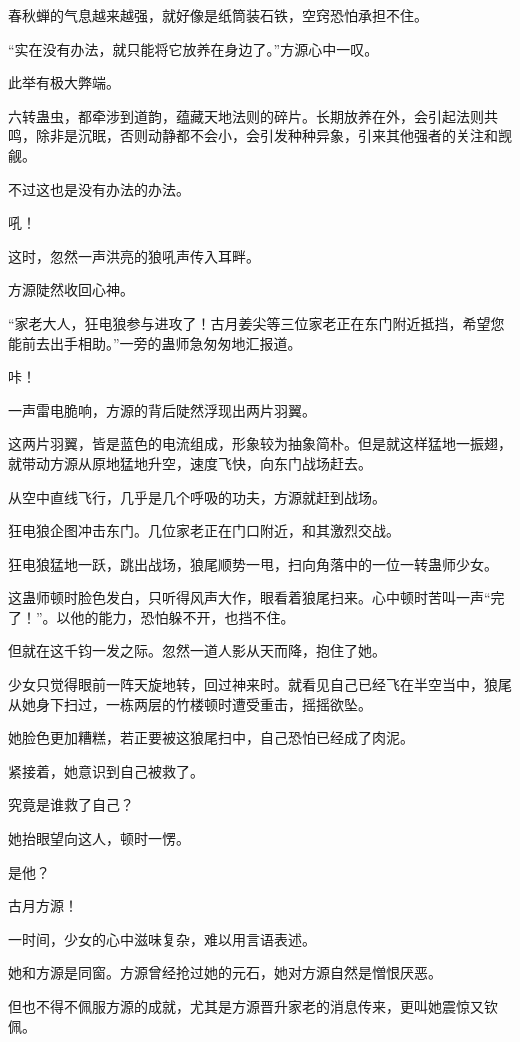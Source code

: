 \begin{this_body}
春秋蝉的气息越来越强，就好像是纸筒装石铁，空窍恐怕承担不住。

“实在没有办法，就只能将它放养在身边了。”方源心中一叹。

此举有极大弊端。

六转蛊虫，都牵涉到道韵，蕴藏天地法则的碎片。长期放养在外，会引起法则共鸣，除非是沉眠，否则动静都不会小，会引发种种异象，引来其他强者的关注和觊觎。

不过这也是没有办法的办法。

吼！

这时，忽然一声洪亮的狼吼声传入耳畔。

方源陡然收回心神。

“家老大人，狂电狼参与进攻了！古月姜尖等三位家老正在东门附近抵挡，希望您能前去出手相助。”一旁的蛊师急匆匆地汇报道。

咔！

一声雷电脆响，方源的背后陡然浮现出两片羽翼。

这两片羽翼，皆是蓝色的电流组成，形象较为抽象简朴。但是就这样猛地一振翅，就带动方源从原地猛地升空，速度飞快，向东门战场赶去。

从空中直线飞行，几乎是几个呼吸的功夫，方源就赶到战场。

狂电狼企图冲击东门。几位家老正在门口附近，和其激烈交战。

狂电狼猛地一跃，跳出战场，狼尾顺势一甩，扫向角落中的一位一转蛊师少女。

这蛊师顿时脸色发白，只听得风声大作，眼看着狼尾扫来。心中顿时苦叫一声“完了！”。以他的能力，恐怕躲不开，也挡不住。

但就在这千钧一发之际。忽然一道人影从天而降，抱住了她。

少女只觉得眼前一阵天旋地转，回过神来时。就看见自己已经飞在半空当中，狼尾从她身下扫过，一栋两层的竹楼顿时遭受重击，摇摇欲坠。

她脸色更加糟糕，若正要被这狼尾扫中，自己恐怕已经成了肉泥。

紧接着，她意识到自己被救了。

究竟是谁救了自己？

她抬眼望向这人，顿时一愣。

是他？

古月方源！

一时间，少女的心中滋味复杂，难以用言语表述。

她和方源是同窗。方源曾经抢过她的元石，她对方源自然是憎恨厌恶。

但也不得不佩服方源的成就，尤其是方源晋升家老的消息传来，更叫她震惊又钦佩。


\end{this_body}
